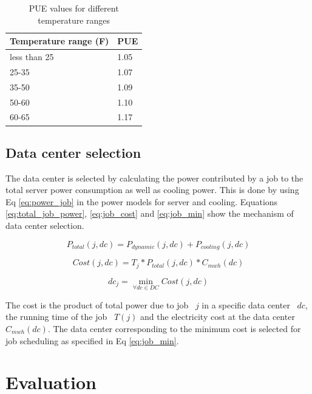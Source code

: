 \documentclass[conference,12pt]{IEEEtran}
\begin{document}
\begin{table}[] 
 \centering
\begin{tabular}{|l|l|}
\hline
\bf{Temperature range (F)}      &       \bf{PUE} \\ \hline
less than 25  & 1.05    \\ \hline
25-35 & 1.07   \\ \hline
35-50 & 1.09    \\ \hline
50-60 & 1.10  \\ \hline
60-65 & 1.17  \\ \hline
\end{tabular}
\caption {PUE values for different temperature ranges} \label{tab:pue}
\end{table}

\subsection{Data center selection}
The data center is selected by calculating the power contributed by a job to the total server power consumption as well as cooling power. This is done by using Eq \ref{eq:power_job} in the power models for server and cooling. 
Equations \ref{eq:total_job_power}, \ref{eq:job_cost} and \ref{eq:job_min} show the mechanism of data center selection. 

\begin{equation} \label{eq:total_job_power}
P_{total}(j,dc) = P_{dynamic}(j,dc) + P_{cooling}(j,dc)
\end{equation}

\begin{equation} \label{eq:job_cost}
Cost(j,dc) = T_{j}*P_{total}(j,dc)*C_{mwh}(dc)
\end{equation}

\begin{equation} \label{eq:job_min}
dc_{j} = \min_{\forall dc \in DC} Cost(j,dc)
\end{equation}

The cost is the product of total power due to job ~$j$ in a specific data center ~$dc$, the running time of the job ~$T(j)$ and the electricity cost at the data center ~$C_{mwh}(dc)$. The data center corresponding to the minimum cost is selected for job scheduling as specified in Eq \ref{eq:job_min}.


\section{Evaluation}
\label{sec:eval}
\end{document}
